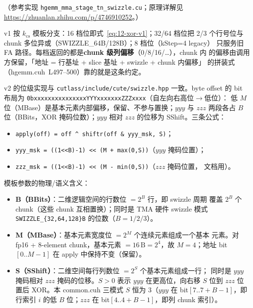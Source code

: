 （参考实现 \texttt{hgemm\_mma\_stage\_tn\_swizzle.cu}；原理详解见
\url{https://zhuanlan.zhihu.com/p/4746910252}。）



v1 按 $k_{\mathrm{cs}}$ 模板分支：16 档位即式~\ref{eq:12-xor-v1}；32/64 档位把
2/3 个行号位与 chunk 多位异或（SWIZZLE\_64B/128B）；8 档位（kStep=4 legacy）
只服务旧 FA 路径。每档返回的都是\textbf{chunk 级列偏移}（0/8/16/…），chunk 内
的偏移由调用方保留，「地址 = 行基址 + slice 基址 + swizzle + chunk 内偏移」
的拼装式（hgemm.cuh~L497--500）靠的就是这条约定。

v2 的位级实现与 \texttt{cutlass/include/cute/swizzle.hpp} 一致。byte offset 的
bit 布局为 \texttt{0b\allowbreak{}xxxxxxxxxxxxxxx\allowbreak{}YYY\allowbreak{}xxxxxxx\allowbreak{}ZZZ\allowbreak{}xxxx}（自左向右高位$\to$低位）：
低 $M$ 位（MBase）是基本元素内部偏移，保留、不参与置换；$\mathit{yyy}$ 与
$\mathit{zzz}$ 两段各占 $B$ 位（BBits，XOR 掩码位数）；$\mathit{yyy}$ 相对 $\mathit{zzz}$
的位移为 SShift。三条公式：

\begin{itemize}
  \item \texttt{apply(off) = off \^{} shiftr(off \& yyy\_msk, S)}；
  \item \texttt{yyy\_msk = ((1<<B)-1) << (M + max(0,S))}\quad（$\mathit{yyy}$ 掩码位置）；
  \item \texttt{zzz\_msk = ((1<<B)-1) << (M - min(0,S))}\quad（$\mathit{zzz}$ 掩码位置，
        文档用）。
\end{itemize}

模板参数的物理/语义含义：

\begin{itemize}
  \item \textbf{B（BBits）}：二维逻辑空间的行数位 $= 2^B$ 行，即 swizzle 周期
        覆盖 $2^B$ 个 chunk（这些 chunk 互相置换）；同时是 TMA 硬件 swizzle
        模式 \texttt{SWIZZLE\_\{32,64,128\}B} 的位数（$B=1/2/3$）。
  \item \textbf{M（MBase）}：基本元素宽度位 $= 2^M$ 个连续元素组成一个基本
        元素。对 fp16 + 8-element chunk，基本元素 $= 16\,\mathrm{B} = 2^4$，故
        $M=4$；地址 bit$[0..M{-}1]$ 在 apply 中保持不变（保留）。
  \item \textbf{S（SShift）}：二维空间每行列数位 $= 2^S$ 个基本元素组成一行；
        同时是 $\mathit{yyy}$ 掩码相对 $\mathit{zzz}$ 掩码的位移。$S>0$ 表示
        $\mathit{yyy}$ 在更高位，向右移 $S$ 位到 $\mathit{zzz}$ 位置后 XOR。本
        common.cuh 三模式 $S$ 恒为 3（$\mathit{yyy}$ 在 bit$[7..7{+}B{-}1]$，即行索引
        $i$ 的低 $B$ 位；$\mathit{zzz}$ 在 bit$[4..4{+}B{-}1]$，即列 chunk 索引）。
\end{itemize}

